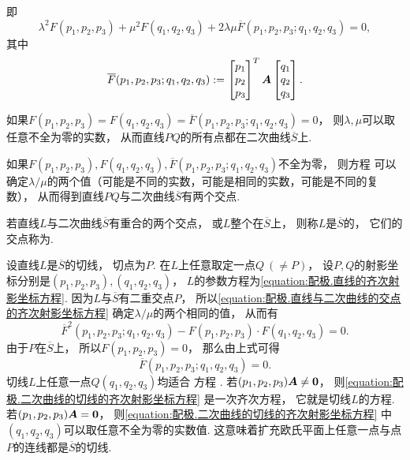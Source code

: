 即\begin{equation}\label{equation:配极.直线与二次曲线的交点的齐次射影坐标方程}
	\lambda^2 F(p_1,p_2,p_3)
	+ \mu^2 F(q_1,q_2,q_3)
	+ 2 \lambda \mu
	\overline{F}(p_1,p_2,p_3;q_1,q_2,q_3)
	= 0,
\end{equation}
其中\begin{equation*}
	\overline{F}(p_1,p_2,p_3;q_1,q_2,q_3)
	:=
	\begin{bmatrix}
		p_1 \\ p_2 \\ p_3
	\end{bmatrix}^T
	\boldsymbol{A}
	\begin{bmatrix}
		q_1 \\ q_2 \\ q_3
	\end{bmatrix}.
\end{equation*}

如果\(
	F(p_1,p_2,p_3)
	= F(q_1,q_2,q_3)
	= \overline{F}(p_1,p_2,p_3;q_1,q_2,q_3)
	= 0
\)，
则\(\lambda,\mu\)可以取任意不全为零的实数，
从而直线\(PQ\)的所有点都在二次曲线\(\overline{S}\)上.

如果\(
	F(p_1,p_2,p_3),
	F(q_1,q_2,q_3),
	\overline{F}(p_1,p_2,p_3;q_1,q_2,q_3)
\)不全为零，
则方程 
可以确定\(\lambda/\mu\)的两个值（可能是不同的实数，可能是相同的实数，可能是不同的复数），
从而得到直线\(PQ\)与二次曲线\(\overline{S}\)有两个交点.

\begin{definition}
若直线\(L\)与二次曲线\(\overline{S}\)有重合的两个交点，
或\(L\)整个在\(\overline{S}\)上，
则称\(L\)是\(\overline{S}\)的，
它们的交点称为.
\end{definition}

设直线\(L\)是\(\overline{S}\)的切线，
切点为\(P\).
在\(L\)上任意取定一点\(Q\ (\neq P)\)，
设\(P,Q\)的射影坐标分别是\((p_1,p_2,p_3),(q_1,q_2,q_3)\)，
\(L\)的参数方程为\cref{equation:配极.直线的齐次射影坐标方程}.
因为\(L\)与\(\overline{S}\)有二重交点\(P\)，
所以\cref{equation:配极.直线与二次曲线的交点的齐次射影坐标方程}
确定\(\lambda/\mu\)的两个相同的值，
从而有\begin{equation*}
	\overline{F}^2(p_1,p_2,p_3;q_1,q_2,q_3)
	- F(p_1,p_2,p_3) \cdot F(q_1,q_2,q_3) = 0.
\end{equation*}
由于\(P\)在\(\overline{S}\)上，
所以\(F(p_1,p_2,p_3) = 0\)，
那么由上式可得\begin{equation}\label{equation:配极.二次曲线的切线的齐次射影坐标方程}
	\overline{F}(p_1,p_2,p_3;q_1,q_2,q_3)
	= 0.
\end{equation}
切线\(L\)上任意一点\(Q(q_1,q_2,q_3)\)均适合
方程 .
若\((p_1,p_2,p_3) \boldsymbol{A} \neq \boldsymbol0\)，
则\cref{equation:配极.二次曲线的切线的齐次射影坐标方程}
是一次齐次方程，
它就是切线\(L\)的方程.
若\((p_1,p_2,p_3) \boldsymbol{A} = \boldsymbol0\)，
则\cref{equation:配极.二次曲线的切线的齐次射影坐标方程}
中\((q_1,q_2,q_3)\)可以取任意不全为零的实数值.
这意味着扩充欧氏平面上任意一点与点\(P\)的连线都是\(\overline{S}\)的切线.

